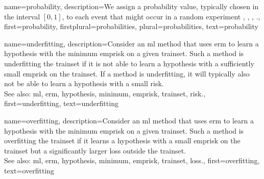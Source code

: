 {name={probability}, 
	description={We assign a probability value, typically chosen in the 
		interval $[0,1]$, to each event that might occur in a random experiment 
		\cite{BillingsleyProbMeasure}, \cite{BertsekasProb}, \cite{HalmosMeasure},  \cite{KallenbergBook}.},
	first={probability},
	firstplural={probabilities},
	plural={probabilities},
	text={probability}
}
	
{name={underfitting},
	description={Consider 
		an \gls{ml} method that uses \gls{erm} to learn a \gls{hypothesis} with the \gls{minimum} \gls{emprisk} 
		on a given \gls{trainset}. Such a method is underfitting the \gls{trainset} if it is 
		not able to learn a \gls{hypothesis} with a sufficiently small \gls{emprisk} on the \gls{trainset}. 
		If a method is underfitting, it will typically also not be able to learn a \gls{hypothesis} with 
		a small \gls{risk}.
					\\ 
		See also: \gls{ml}, \gls{erm}, \gls{hypothesis}, \gls{minimum}, \gls{emprisk}, \gls{trainset}, \gls{risk}.},
	first={underfitting},
	text={underfitting}
}

{name={overfitting},
	description={Consider an 
		\gls{ml} method that uses \gls{erm} to learn a \gls{hypothesis} with the \gls{minimum} \gls{emprisk} on 
		a given \gls{trainset}. Such a method is overfitting the \gls{trainset} if it learns 
		a \gls{hypothesis} with a small \gls{emprisk} on the \gls{trainset} but a significantly larger \gls{loss} outside the \gls{trainset}.
					\\ 
		See also: \gls{ml}, \gls{erm}, \gls{hypothesis}, \gls{minimum}, \gls{emprisk}, \gls{trainset}, \gls{loss}.},
	first={overfitting},
	text={overfitting}
}


